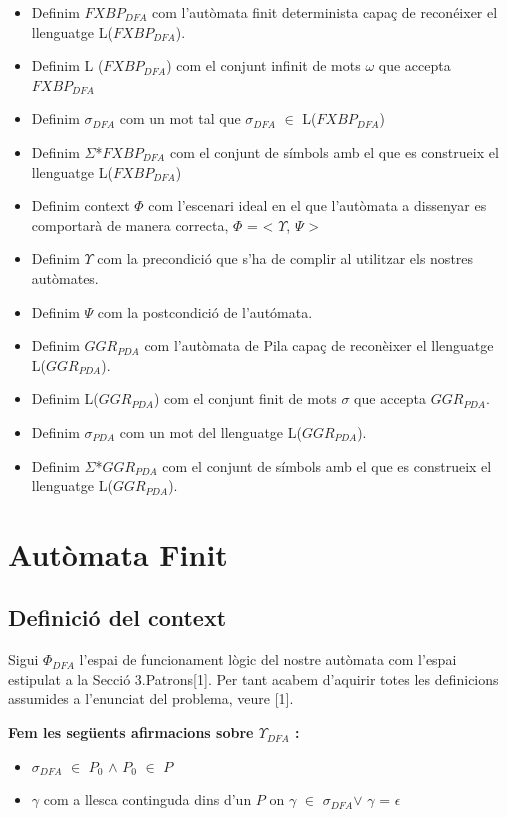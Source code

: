 \documentclass[12pt,a4paper]{report}
\def \w{$\omega$}
\def \dfa{$FXBP_{DFA} $}
\def \alphabetDFA{$\Sigma$*\dfa}
\def \alphabetPDA{$\Sigma$*\pda}
\def \wdfa{$\sigma_{DFA} $}
\def \wpda{$\sigma_{PDA} $}
\def \pda{$GGR_{PDA} $}
\def \context{$\Phi$}
\def \contextDFA{$\Phi_{DFA}$}
\def \pre{$\Upsilon$}
\def \preDFA{$\Upsilon_{DFA}$}
\def \post{$\Psi$}
\def \llesca{$\gamma$}
\begin{document}
\begin{itemize}
\item Definim \dfa{} com l’autòmata finit determinista capaç de reconéixer el llenguatge L(\dfa{}).
\item Definim L (\dfa{}) com el conjunt infinit de mots \w{} que accepta \dfa{}
\item Definim \wdfa{} com un mot tal que \wdfa{} $\in$ L(\dfa{})
\item Definim \alphabetDFA{} com el conjunt de símbols amb el que es construeix el llenguatge L(\dfa{})
\item Definim context \context{} com l’escenari ideal en el que l’autòmata a dissenyar es comportarà de manera correcta, \context{} = < \pre{}, \post{} >
\item Definim \pre{} com la precondició que s'ha de complir al utilitzar els nostres autòmates.
\item Definim \post{} com la postcondició de l'autómata.
\item Definim \pda{} com l'autòmata de Pila capaç de reconèixer el llenguatge L(\pda{}).
\item Definim L(\pda{}) com el conjunt finit de mots $\sigma$ que accepta \pda{}.
\item Definim \wpda{} com un mot del llenguatge L(\pda{}).
\item Definim \alphabetPDA{} com el conjunt de símbols amb el que es construeix el llenguatge L(\pda).

\end{itemize}

\chapter{Autòmata Finit}

\section{Definició del context}

Sigui \contextDFA{} l'espai de funcionament lògic del nostre autòmata com l'espai estipulat a la Secció 3.Patrons[1]. Per tant acabem d'aquirir totes les definicions assumides a l'enunciat del problema, veure [1].

\textbf{Fem les següents afirmacions sobre \preDFA{} :}
\begin{itemize}
\item \wdfa{} $\in$ $P_0$ $\wedge$ $P_0$ $\in$ $P$
\item \llesca{} com a llesca continguda dins d'un $P$ on \llesca{} $\in$ \wdfa $\vee$ \llesca{} = $\epsilon$
\end{itemize}
\end{document}

